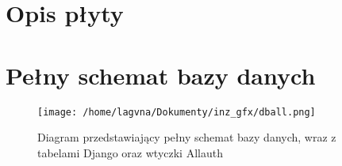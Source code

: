 \documentclass[12pt,titlepage]{article}
\begin{document}
\newpage


\newpage
\begin{appendices}
\section{Opis płyty}
\newpage
 \section{Pełny schemat bazy danych}
 \label{sec:dball}
 \begin{figure}[htb]
\begin{center}
 \texttt{[image: /home/lagvna/Dokumenty/inz\_gfx/dball.png]}
 \caption{Diagram przedstawiający pełny schemat bazy danych, wraz z tabelami Django oraz wtyczki Allauth}
 \label{fig:db}
 \end{center}
\end{figure}

\end{appendices}
\end{document}
